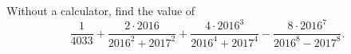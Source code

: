 Without a calculator, find the value of
\[
\dfrac{1}{4033}+\dfrac{2\cdot2016}{2016^2+2017^2}+\dfrac{4\cdot2016^3}{2016^4+2017^4}-\dfrac{8\cdot2016^7}{2016^8-2017^8}.
\]
